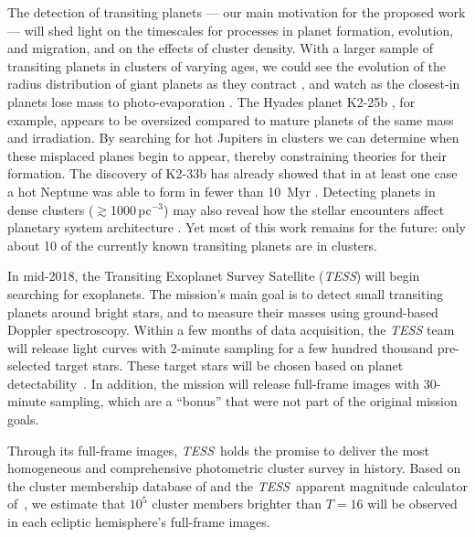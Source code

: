 \documentclass[letterpaper,11pt]{article}
\newcommand{\tess}{{\it TESS}}
\begin{document}
The detection of transiting planets --- our main motivation for the
proposed work --- will shed light on the timescales for processes in
planet formation, evolution, and migration, and on the effects of
cluster density. With a larger sample of transiting planets in clusters of
varying ages, we could see the evolution of the radius distribution of
giant planets as they contract \citep{Fortney_et_al_2007}, and watch
as the closest-in planets lose mass to photo-evaporation
\citep{Owen_Wu_2017, Fulton_et_al_2017}.  The Hyades planet K2-25b
\citep{Mann_K2_25_2016}, for example, appears to be oversized compared
to mature planets of the same mass and irradiation.  By searching for
hot Jupiters in clusters we can determine when these misplaced planes
begin to appear,
thereby constraining theories for their formation. The discovery of
K2-33b has already showed that in at least one case a hot Neptune was
able to form in fewer than 10~Myr \citep{David_et_al_2017,Mann_K2_33b_2016}.
Detecting planets in dense clusters ($\gtrsim$1000\,pc$^{-3}$) may
also reveal how the stellar encounters affect planetary
system architecture \citep{Meibom_et_al_2013}.  Yet most of this work
remains for the future: only about 10 of the currently known
transiting planets are in clusters.

In mid-2018, the Transiting Exoplanet Survey Satellite (\tess) will
begin searching for exoplanets.  The mission's main
goal is to detect small transiting planets around bright stars, and to
measure their masses using ground-based Doppler spectroscopy.  Within a
few months of data acquisition, the {\it TESS} team will release light curves
with 2-minute sampling for a few hundred thousand pre-selected target
stars.  These target stars will be chosen based on planet
detectability~\citep{Stassun_et_al_2017}.  In addition, the mission will
release full-frame images with 30-minute sampling, which are a ``bonus''
that were not part of the original mission goals.

Through its full-frame images, \tess\ holds the promise to
deliver the most homogeneous and comprehensive photometric cluster
survey in history.  Based on the cluster membership database of
\citet{Kharchenko_et_al_2013} and the $\!$\tess\ apparent magnitude
calculator of~\citet{Jaffe_Barclay_2017}, we estimate that $10^5$
cluster members brighter than $T=16$ will be observed in each
ecliptic hemisphere's full-frame images.
\end{document}
